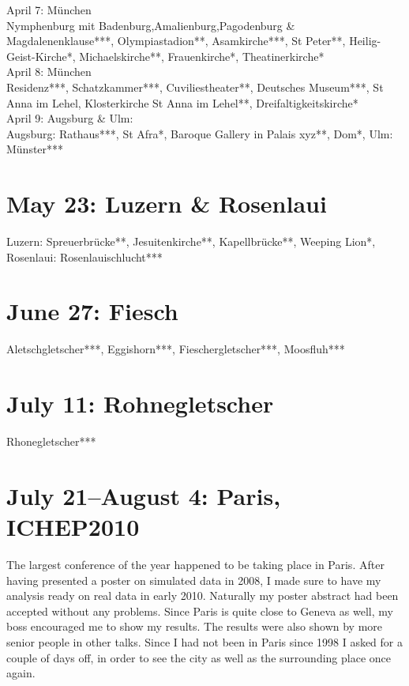 April 7: M\"unchen\\
Nymphenburg mit Badenburg,Amalienburg,Pagodenburg \& Magdalenenklause***, Olympiastadion**, Asamkirche***, St Peter**, Heilig-Geist-Kirche*, Michaelskirche**, Frauenkirche*, Theatinerkirche*\\

April 8: M\"unchen\\
Residenz***, Schatzkammer***, Cuviliestheater**, Deutsches Museum***, St Anna im Lehel, Klosterkirche St Anna im Lehel**, Dreifaltigkeitskirche*\\

April 9: Augsburg \& Ulm:\\
Augsburg: Rathaus***, St Afra*, Baroque Gallery in Palais xyz**, Dom*, Ulm: M\"unster***

\section{May 23: Luzern \& Rosenlaui}
\label{2010:Luzern}

Luzern: Spreuerbr\"ucke**, Jesuitenkirche**, Kapellbr\"ucke**, Weeping Lion*, Rosenlaui: Rosenlauischlucht***

\section{June 27: Fiesch}
\label{Fiesch2010}

Aletschgletscher***, Eggishorn***, Fieschergletscher***, Moosfluh***

\section{July 11: Rohnegletscher}
\label{Rhonegletscher2010}

Rhonegletscher***

\section{July 21--August 4: Paris, ICHEP2010}
\label{Paris2010}

The largest conference of the year happened to be taking place in Paris. After having presented a poster on simulated data in 2008, I made sure to have my analysis ready on real data in early 2010. Naturally my poster abstract had been accepted without any problems. Since Paris is quite close to Geneva as well, my boss encouraged me to show my results. The results were also shown by more senior people in other talks. Since I had not been in Paris since 1998 I asked for a couple of days off, in order to see the city as well as the surrounding place once again.\\

